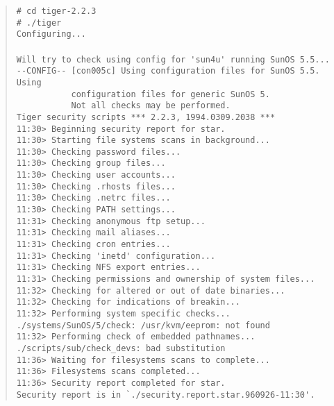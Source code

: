 \documentclass[11pt]{article}
\begin{document}
\begin{quote}
\begin{scriptsize}
\verb+# cd tiger-2.2.3+\\
\verb+# ./tiger+\\
\verb+Configuring...+\\
\verb++\\
\verb+Will try to check using config for 'sun4u' running SunOS 5.5...+\\
\verb+--CONFIG-- [con005c] Using configuration files for SunOS 5.5. Using+\\
\verb+           configuration files for generic SunOS 5.+\\
\verb+           Not all checks may be performed.+\\
\verb+Tiger security scripts *** 2.2.3, 1994.0309.2038 ***+\\
\verb+11:30> Beginning security report for star.+\\
\verb+11:30> Starting file systems scans in background...+\\
\verb+11:30> Checking password files...+\\
\verb+11:30> Checking group files...+\\
\verb+11:30> Checking user accounts...+\\
\verb+11:30> Checking .rhosts files...+\\
\verb+11:30> Checking .netrc files...+\\
\verb+11:30> Checking PATH settings...+\\
\verb+11:31> Checking anonymous ftp setup...+\\
\verb+11:31> Checking mail aliases...+\\
\verb+11:31> Checking cron entries...+\\
\verb+11:31> Checking 'inetd' configuration...+\\
\verb+11:31> Checking NFS export entries...+\\
\verb+11:31> Checking permissions and ownership of system files...+\\
\verb+11:32> Checking for altered or out of date binaries...+\\
\verb+11:32> Checking for indications of breakin...+\\
\verb+11:32> Performing system specific checks...+\\
\verb+./systems/SunOS/5/check: /usr/kvm/eeprom: not found+\\
\verb+11:32> Performing check of embedded pathnames...+\\
\verb+./scripts/sub/check_devs: bad substitution+\\
\verb+11:36> Waiting for filesystems scans to complete...+\\
\verb+11:36> Filesystems scans completed...+\\
\verb+11:36> Security report completed for star.+\\
\verb+Security report is in `./security.report.star.960926-11:30'.+
\end{scriptsize}
\end{quote}
\end{document}
